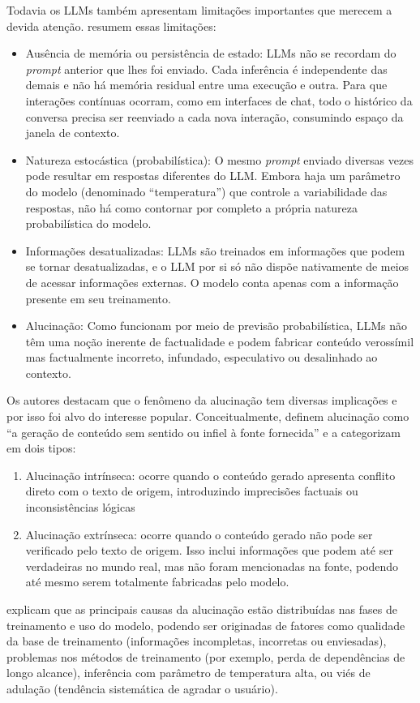 \documentclass[12pt,oneside,a4paper,brazil,sumario=tradicional]{abntex2}
\begin{document}
Todavia os LLMs também apresentam limitações importantes que merecem a devida atenção.  resumem essas limitações:

\begin{itemize}
  \item Ausência de memória ou persistência de estado: LLMs não se recordam do \textit{prompt }anterior que lhes foi enviado. Cada inferência é independente das demais e não há memória residual entre uma execução e outra.  Para que interações contínuas ocorram, como em interfaces de chat, todo o histórico da conversa precisa ser reenviado a cada nova interação, consumindo espaço da janela de contexto.
  \item Natureza estocástica (probabilística): O mesmo \textit{prompt }enviado diversas vezes pode resultar em respostas diferentes do LLM. Embora haja um parâmetro do modelo (denominado “temperatura”) que controle a variabilidade das respostas, não há como contornar por completo a própria natureza probabilística do modelo.
  \item Informações desatualizadas: LLMs são treinados em informações que podem se tornar desatualizadas, e o LLM por si só não dispõe nativamente de meios de acessar informações externas. O modelo conta apenas com a informação presente em seu treinamento.
  \item Alucinação: Como funcionam por meio de previsão probabilística, LLMs não têm uma noção inerente de factualidade e podem fabricar conteúdo verossímil mas factualmente incorreto, infundado, especulativo ou desalinhado ao contexto.
\end{itemize}
Os autores destacam que o fenômeno da alucinação tem diversas implicações e por isso foi alvo do interesse popular. Conceitualmente,  definem alucinação como “a geração de conteúdo sem sentido ou infiel à fonte fornecida” e a categorizam em dois tipos:

\begin{enumerate}
  \item Alucinação intrínseca: ocorre quando o conteúdo gerado apresenta conflito direto com o texto de origem, introduzindo imprecisões factuais ou inconsistências lógicas
  \item Alucinação extrínseca: ocorre quando o conteúdo gerado não pode ser verificado pelo texto de origem. Isso inclui informações que podem até ser verdadeiras no mundo real, mas não foram mencionadas na fonte, podendo até mesmo serem totalmente fabricadas pelo modelo.
\end{enumerate}
 explicam que as principais causas da alucinação estão distribuídas nas fases de treinamento e uso do modelo, podendo ser originadas de fatores como qualidade da base de treinamento (informações incompletas, incorretas ou enviesadas), problemas nos métodos de treinamento (por exemplo, perda de dependências de longo alcance), inferência com parâmetro de temperatura alta, ou viés de adulação (tendência sistemática de agradar o usuário).
\end{document}

